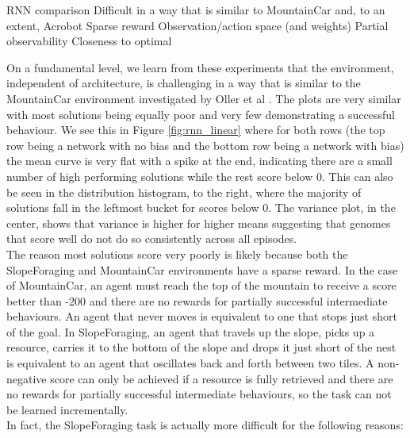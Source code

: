 \documentclass[12pt]{article}
\begin{document}
RNN comparison
Difficult in a way that is similar to MountainCar and, to an extent, Acrobot
Sparse reward
Observation/action space (and weights)
Partial observability
Closeness to optimal


On a fundamental level, we learn from these experiments that the environment, independent of architecture, is challenging in a way that is similar to the MountainCar environment  \cite{MountainCar} investigated by Oller et al \cite{oller:AAMAS:2020}. 
The plots are very similar with most solutions being equally poor and very few demonstrating a successful behaviour. 
We see this in Figure \ref{fig:rnn_linear} where for both rows (the top row being a network with no bias and the bottom row being a network with bias) the mean curve is very flat with a spike at the end, indicating there are a small number of high performing solutions while the rest score below 0.
This can also be seen in the distribution histogram, to the right, where the majority of solutions fall in the leftmost bucket for scores below 0. 
The variance plot, in the center, shows that variance is higher for higher means suggesting that genomes that score well do not do so consistently across all episodes.\\

The reason most solutions score very poorly is likely because both the SlopeForaging and MountainCar environments have a sparse reward. 
In the case of MountainCar, an agent must reach the top of the mountain to receive a score better than -200 and there are no rewards for partially successful intermediate behaviours. 
An agent that never moves is equivalent to one that stops just short of the goal. 
In SlopeForaging, an agent that travels up the slope, picks up a resource, carries it to the bottom of the slope and drops it just short of the nest is equivalent to an agent that oscillates back and forth between two tiles. 
A non-negative score can only be achieved if a resource is fully retrieved and there are no rewards for partially successful intermediate behaviours, so the task can not be learned incrementally.\\

In fact, the SlopeForaging task is actually more difficult for the following reasons:
\end{document}
